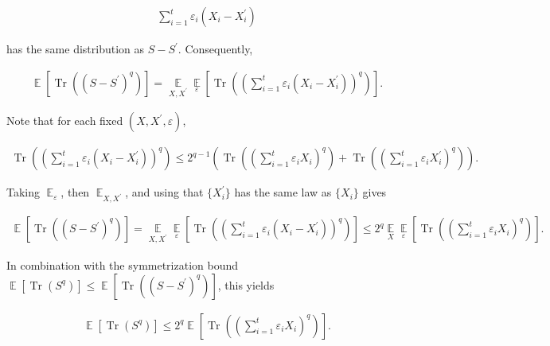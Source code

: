 \documentclass[10pt,a4paper]{article}
\begin{document}
\[\begin{gathered}
\sum_{i=1}^{t}\varepsilon_{i}\left(X_{i}-X_{i}^{\prime}\right)
\end{gathered}\]


has the same distribution as $S-S^{\prime}$.
Consequently,\par


\[\begin{gathered}
\operatorname*{\mathbb{E}}\left[\operatorname*{Tr}\left((S-S^{\prime})^{q}\right)\right]=\operatorname*{\mathbb{E}}_{X,X^{\prime}}\operatorname*{\mathbb{E}}_{\varepsilon}\left[\operatorname*{Tr}\left(\left(\sum_{i=1}^{t}\varepsilon_{i}(X_{i}-X_{i}^{\prime})\right)^{q}\right)\right].
\end{gathered}\]




Note that for each fixed $(X,X^{\prime},\varepsilon)$,\par


\[\begin{gathered}
\operatorname*{Tr}\left(\left(\sum_{i=1}^{t}\varepsilon_{i}(X_{i}-X_{i}^{\prime})\right)^{q}\right)\leq 2^{q-1}\left(\operatorname*{Tr}\left((\sum_{i=1}^{t}\varepsilon_{i}X_{i})^{q}\right)+\operatorname*{Tr}\left((\sum_{i=1}^{t}\varepsilon_{i}X_{i}^{\prime})^{q}\right)\right).
\end{gathered}\]


Taking $\operatorname*{\mathbb{E}}_{\varepsilon}$, then $\operatorname*{\mathbb{E}}_{X,X^{\prime}}$, and using that $\{X_{i}^{\prime}\}$ has the same law as $\{X_{i}\}$ gives\par


\[\begin{gathered}
\operatorname*{\mathbb{E}}\left[\operatorname*{Tr}\left((S-S^{\prime})^{q}\right)\right]=\operatorname*{\mathbb{E}}_{X,X^{\prime}}\operatorname*{\mathbb{E}}_{\varepsilon}\left[\operatorname*{Tr}\left((\sum_{i=1}^{t}\varepsilon_{i}(X_{i}-X_{i}^{\prime}))^{q}\right)\right]\leq 2^{q}\operatorname*{\mathbb{E}}_{X}\operatorname*{\mathbb{E}}_{\varepsilon}\left[\operatorname*{Tr}\left((\sum_{i=1}^{t}\varepsilon_{i}X_{i})^{q}\right)\right].
\end{gathered}\]


In combination with the symmetrization bound
$\operatorname*{\mathbb{E}}[\operatorname*{Tr}(S^{q})]\leq\operatorname*{\mathbb{E}}[\operatorname*{Tr}((S-S^{\prime})^{q})]$,
this yields\par


\[\begin{gathered}
\operatorname*{\mathbb{E}}\left[\operatorname*{Tr}(S^{q})\right]\leq 2^{q}\operatorname*{\mathbb{E}}\left[\operatorname*{Tr}\left((\sum_{i=1}^{t}\varepsilon_{i}X_{i})^{q}\right)\right].
\end{gathered}\]
\end{document}
